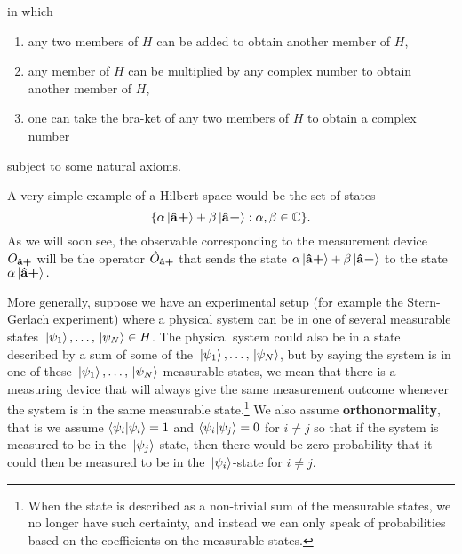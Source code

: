 %
in which 
\begin{enumerate}[noitemsep, nosep, topsep=0pt]
\item any two members of $H$ can be added to obtain another member of $H$, 
\item any member of $H$ can be multiplied by any complex number to obtain another member of $H$,
\item one can take the bra-ket of any two members of $H$ to obtain a complex number\end{enumerate}
subject to some natural axioms.

A very simple example of a Hilbert space would be the set of states 
\begin{equation*}
\{\alpha\ket*{{\vb{\hat{{a}}}\bm{+}}}+\beta\ket*{{\vb{\hat{{a}}}\bm{-}}}:\alpha,\beta\in\mathbb{C}\}.
\end{equation*} 
As we will soon see, the observable corresponding to the measurement device $O_{{\vb{\hat{{a}}}\bm{+}}}$ will be the operator $\hat{O}_{{\vb{\hat{{a}}}\bm{+}}}$ that sends the state $\alpha\ket*{{\vb{\hat{{a}}}\bm{+}}}+\beta\ket*{{\vb{\hat{{a}}}\bm{-}}}$ to the state $\alpha\ket*{{\vb{\hat{{a}}}\bm{+}}}.$

More generally, suppose we have an experimental setup (for example the Stern-Gerlach experiment) where a physical system can be in one of several measurable states $\ket*{\psi_1},\ldots,\ket*{\psi_N}\in H$. The physical system could also be in a state described by a sum of some of the $\ket*{\psi_1},\ldots,\ket*{\psi_N}$,  but by saying the system is in one of these $\ket*{\psi_1},\ldots,\ket*{\psi_N}$ measurable states, we mean that there is a measuring device that will always give the same measurement outcome whenever the system is in the same { measurable state.\footnote{When the state is described as a non-trivial sum of the measurable states, we no longer have such certainty, and instead we can only speak of probabilities based on the coefficients on the measurable states.} We also assume} \textbf{orthonormality}, that is we assume $\ip{\psi_i}{\psi_i}=1$ and $\ip{\psi_i}{\psi_j}=0$ for $i\neq j$ so that if the system is measured to be in the $\ket*{\psi_j}$-state, then there would be zero probability that it could then be measured to be in the $\ket*{\psi_i}$-state for $i\neq j$.  

